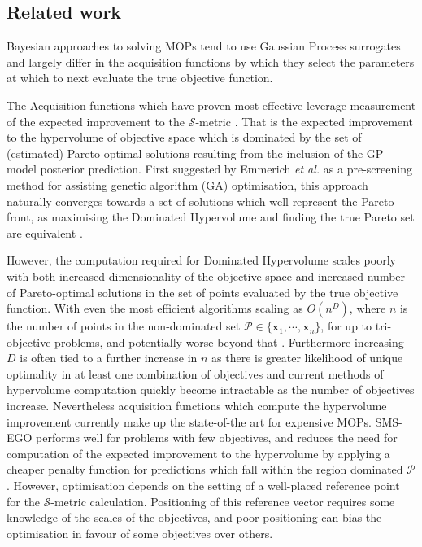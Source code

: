 \documentclass[conference]{IEEEtran}
\makeatletter
\newcommand\hpv{Dominated Hypervolume\xspace}
\newcommand\smsego{SMS-EGO\xspace}
\newcommand\gp{GP\xspace}
\newcommand{\bx}{\mathbf{x}}
\newcommand*{\etal}{\textit{et al.}\@\xspace}
\makeatother
\begin{document}
\subsection{Related work}\label{section:related_work}
Bayesian approaches to solving MOPs tend to use Gaussian Process surrogates and largely differ in the acquisition functions by which they select the parameters at which to next evaluate the true objective function.

The Acquisition functions which have proven most effective leverage measurement of the expected improvement to the $\mathcal{S}$-metric  \cite{emmerich2008computation}. That is the expected improvement to the hypervolume of objective space which is dominated by the set of (estimated) Pareto optimal solutions resulting from the inclusion of the \gp model posterior prediction. First suggested by Emmerich \etal  \cite{emmerich2006single} as a pre-screening method for assisting genetic algorithm (GA) optimisation, this approach naturally converges towards a set of solutions which well represent the Pareto front, as maximising the \hpv and finding the true Pareto set are equivalent \cite{fleischer2003measure}. 

However, the computation required for \hpv scales poorly with both increased dimensionality of the objective space and increased number of Pareto-optimal solutions in the set of points evaluated by the true objective function. With even the most efficient algorithms scaling as $O(n^D)$, where $n$ is the number of points in the non-dominated set $\mathcal{P}\in\{\bx_1, \cdots, \bx_n\}$, for up to tri-objective problems, and potentially worse beyond that \cite{hupkens2014faster}. Furthermore increasing $D$ is often tied to a further increase in $n$ as there is greater likelihood of unique optimality in at least one combination of objectives and current methods of hypervolume computation quickly become intractable as the number of objectives increase. Nevertheless acquisition functions which compute the hypervolume improvement currently make up the state-of-the art for expensive MOPs. \smsego \cite{ponweiser2008multiobjective, wagner2010expected} performs well for problems with few objectives, and reduces the need for computation of the expected improvement to the hypervolume by applying a cheaper penalty function for predictions which fall within the region dominated $\mathcal{P}$. However, optimisation depends on the setting of a well-placed reference point for the $\mathcal{S}$-metric calculation. Positioning of this reference vector requires some knowledge of the scales of the objectives, and poor positioning can bias the optimisation in favour of some objectives over others. 
\end{document}
